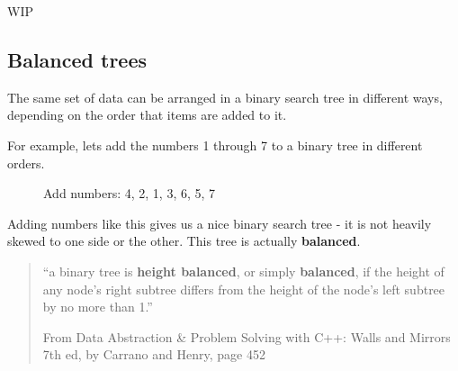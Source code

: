 \documentclass[a4paper,12pt,oneside]{book}
\begin{document}
    WIP

    \newpage
    
    \subsection{Balanced trees}

    The same set of data can be arranged in a binary search tree
    in different ways, depending on the order that items are added to it.

    For example, lets add the numbers 1 through 7 to a binary tree
    in different orders.

    \begin{figure}[h]
        \begin{center}
        \end{center}
        \caption{Add numbers: 4, 2, 1, 3, 6, 5, 7}
    \end{figure}

    Adding numbers like this gives us a nice binary search tree -
    it is not heavily skewed to one side or the other. This tree
    is actually \textbf{balanced}.

    \begin{quote}
        ``a binary tree is \textbf{height balanced}, or simply \textbf{balanced},
        if the height of any node's right subtree differs from the height of the node's
        left subtree by no more than 1.''
        
        \footnotesize
        From Data Abstraction \& Problem Solving with C++: Walls and Mirrors 7th ed, by Carrano and Henry, page 452
    \end{quote}
\end{document}
